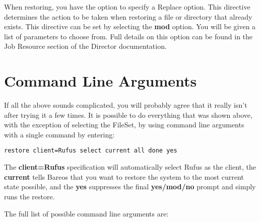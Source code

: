 When restoring, you have the option to specify a Replace option.  This
directive determines the action to be taken when restoring a file or
directory that already exists.  This directive can be set by selecting
the {\bf mod} option.  You will be given a list of parameters to choose
from.  Full details on this option can be found in the Job Resource section
of the Director documentation.

\label{CommandArguments}

\section{Command Line Arguments}

If all the above sounds complicated, you will probably agree that it really
isn't after trying it a few times. It is possible to do everything that was
shown above, with the exception of selecting the FileSet, by using command
line arguments with a single command by entering:

\footnotesize
\begin{verbatim}
restore client=Rufus select current all done yes
\end{verbatim}
\normalsize

The {\bf client=Rufus} specification will automatically select Rufus as the
client, the {\bf current} tells Bareos that you want to restore the system to
the most current state possible, and the {\bf yes} suppresses the final {\bf
yes/mod/no} prompt and simply runs the restore.

The full list of possible command line arguments are:

